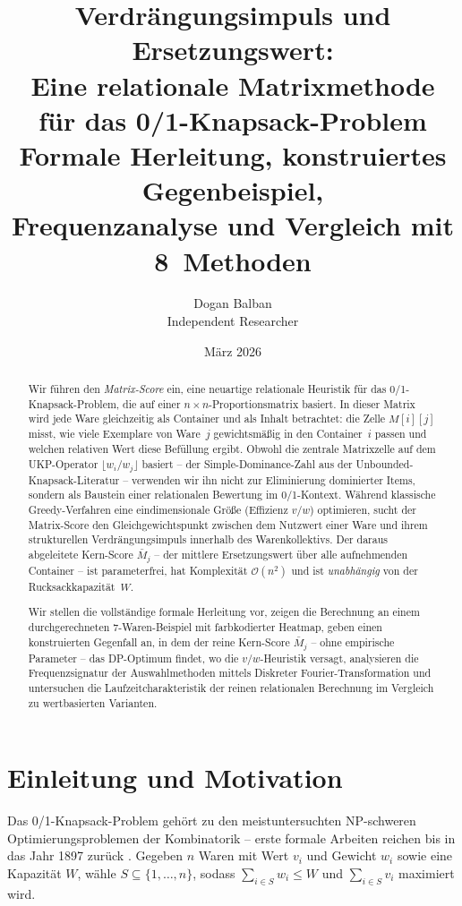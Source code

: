 \documentclass[a4paper,11pt]{article}
\title{\textbf{Verdrängungsimpuls und Ersetzungswert:\\
Eine relationale Matrixmethode\\
für das 0/1-Knapsack-Problem}\\[0.3em]
\large Formale Herleitung, konstruiertes Gegenbeispiel,\\
Frequenzanalyse und Vergleich mit 8~Methoden}
\author{Dogan Balban\\[0.3em]
\small Independent Researcher\\
\small \texttt{}}
\date{März 2026}
\begin{document}
\maketitle

\begin{abstract}
\noindent
Wir führen den \emph{Matrix-Score} ein, eine neuartige relationale
Heuristik für das 0/1-Knapsack-Problem, die auf einer
$n\times n$-Proportionsmatrix basiert. In dieser Matrix wird jede
Ware gleichzeitig als Container und als Inhalt betrachtet: die
Zelle $M[i][j]$ misst, wie viele Exemplare von Ware~$j$
gewichtsmäßig in den Container~$i$ passen und welchen relativen
Wert diese Befüllung ergibt.
Obwohl die zentrale Matrixzelle auf dem
UKP-Operator $\lfloor w_i/w_j \rfloor$ basiert -- der
Simple-Dominance-Zahl aus der Unbounded-Knapsack-Literatur --
verwenden wir ihn nicht zur Eliminierung dominierter Items,
sondern als Baustein einer relationalen Bewertung im 0/1-Kontext.
Während klassische Greedy-Verfahren eine eindimensionale Größe
(Effizienz $v/w$) optimieren, sucht der Matrix-Score den
Gleichgewichtspunkt zwischen dem Nutzwert einer Ware und ihrem
strukturellen Verdrängungsimpuls innerhalb des Warenkollektivs.
Der daraus abgeleitete Kern-Score $\bar{M}_j$ -- der mittlere
Ersetzungswert über alle aufnehmenden Container -- ist
parameterfrei, hat Komplexität $\mathcal{O}(n^2)$ und ist
\emph{unabhängig} von der Rucksackkapazität~$W$.

Wir stellen die vollständige formale Herleitung vor, zeigen die
Berechnung an einem durchgerechneten 7-Waren-Beispiel mit
farbkodierter Heatmap, geben einen konstruierten Gegenfall an,
in dem der reine Kern-Score $\bar{M}_j$ -- ohne empirische
Parameter -- das DP-Optimum findet, wo die $v/w$-Heuristik
versagt, analysieren die Frequenzsignatur der Auswahlmethoden
mittels Diskreter Fourier-Transformation und untersuchen die
Laufzeitcharakteristik der reinen relationalen Berechnung
im Vergleich zu wertbasierten Varianten.
\end{abstract}

\tableofcontents
\bigskip

\section{Einleitung und Motivation}

Das 0/1-Knapsack-Problem gehört zu den meistuntersuchten NP-schweren
Optimierungsproblemen der Kombinatorik -- erste formale Arbeiten reichen
bis in das Jahr 1897 zurück \citep{kellerer2004}.
Gegeben $n$ Waren mit Wert $v_i$ und Gewicht $w_i$ sowie eine
Kapazität $W$, wähle $S \subseteq \{1,\ldots,n\}$,
sodass $\sum_{i\in S} w_i \le W$ und $\sum_{i\in S} v_i$ maximiert wird.
\end{document}
